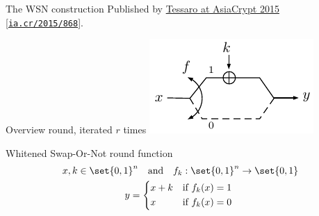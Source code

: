 \begin{frame}{The WSN construction}
    \centering
    Published by \href{https://doi.org/10.1007/978-3-662-48800-3_18}{Tessaro at AsiaCrypt 2015} [\texttt{\href{https://ia.cr/2015/868}{ia.cr/2015/868}}].
    \begin{minipage}[t][90pt][t]{0.47\textwidth}
        \begin{block}{Overview round, iterated $r$ times\vpPp}
            \centering
            \vfill
            \includegraphics{data/wsn-schematic-1round}
            \vfill
        \end{block}
    \end{minipage}
    \hspace{5pt}
    \begin{minipage}[t][90pt][t]{0.47\textwidth}
        \begin{block}{Whitened Swap-Or-Not round function}
            \vspace*{-12.5pt}
            \begin{gather*}
                x, k \in \set{0,1}^n \quad\text{and}\quad f_{k} : \set{0,1}^n \to \set{0,1} \\
                y = \begin{cases*}
                    x + k & if $f_{k}(x) = 1$ \\
                    x     & if $f_{k}(x) = 0$
                    \end{cases*}
            \end{gather*}
        \end{block}
    \end{minipage}



\end{frame}
